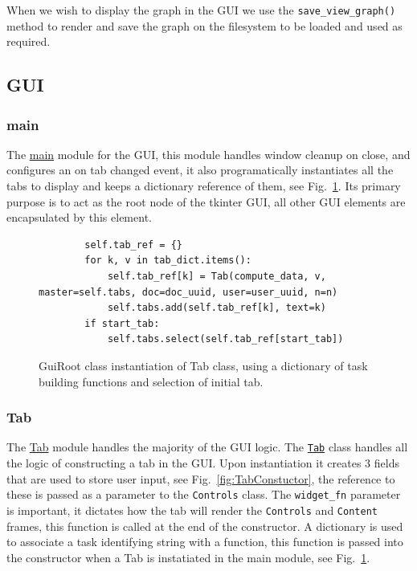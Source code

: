 \documentclass[11pt]{article}
\newcommand{\code}[1]{\colorbox{light-gray}{\texttt{#1}}}
\begin{document}
When we wish to display the graph in the GUI we use the \code{save\_view\_graph()} method to render and save the graph on the filesystem to be loaded and used as required.

\subsection{GUI}
\subsubsection{main}
The \href{https://www2.macs.hw.ac.uk/~sf52/DocuTrace/html/DocuTrace.Gui.html#module-DocuTrace.Gui.main}{main} module for the GUI, this module handles window cleanup on close, and configures an on tab changed event, it also programatically instantiates all the tabs to display and keeps a dictionary reference of them, see Fig.~\ref{fig:GuirootConstructor}. 
Its primary purpose is to act as the root node of the tkinter GUI, all other GUI elements are encapsulated by this element.

\begin{figure}[h]
    \begin{verbatim}
        self.tab_ref = {}
        for k, v in tab_dict.items():
            self.tab_ref[k] = Tab(compute_data, v, master=self.tabs, doc=doc_uuid, user=user_uuid, n=n)
            self.tabs.add(self.tab_ref[k], text=k)
        if start_tab:
            self.tabs.select(self.tab_ref[start_tab])
    \end{verbatim}
    \caption{GuiRoot class instantiation of Tab class, using a dictionary of task building functions and selection of initial tab.}
    \label{fig:GuirootConstructor}
\end{figure}

\subsubsection{Tab}
The \href{https://www2.macs.hw.ac.uk/~sf52/DocuTrace/html/DocuTrace.Gui.html#module-DocuTrace.Gui.Tab}{Tab} module handles the majority of the GUI logic. The \href{https://www2.macs.hw.ac.uk/~sf52/DocuTrace/html/DocuTrace.Gui.html#DocuTrace.Gui.Tab.Tab}{\code{Tab}} class handles all the logic of constructing a tab in the GUI.
Upon instantiation it creates 3 fields that are used to store user input, see Fig.~\ref{fig:TabConstuctor}, the reference to these is passed as a parameter to the \code{Controls} class.
The \code{widget\_fn} parameter is important, it dictates how the tab will render the \code{Controls} and \code{Content} frames, this function is called at the end of the constructor.
A dictionary is used to associate a task identifying string with a function, this function is passed into the constructor when a Tab is instatiated in the main module, see Fig.~\ref{fig:GuirootConstructor}.
\end{document}
